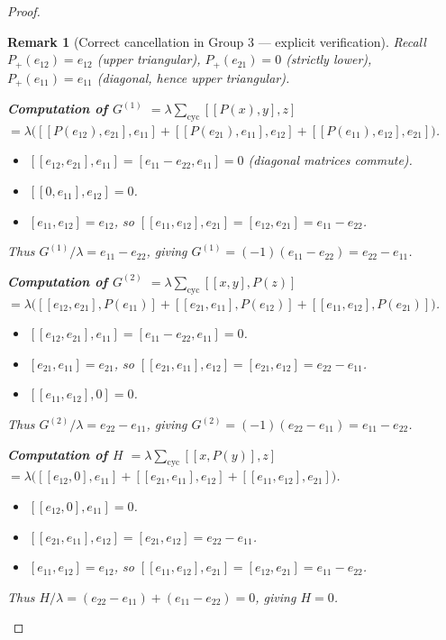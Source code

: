 \documentclass[10pt,a4paper]{amsart}
\newtheorem{remark}{Remark}
\begin{document}
\begin{proof}
\begin{remark}[Correct cancellation in Group 3 --- explicit verification]
Recall $P_+(e_{12}) = e_{12}$ (upper triangular), $P_+(e_{21}) = 0$ (strictly lower),
$P_+(e_{11}) = e_{11}$ (diagonal, hence upper triangular).

\medskip
\noindent\textbf{Computation of $G^{(1)}$} $= \lambda\sum_{\mathrm{cyc}}[[P(x),y],z]$
$= \lambda\bigl([[P(e_{12}),e_{21}],e_{11}] + [[P(e_{21}),e_{11}],e_{12}]
+ [[P(e_{11}),e_{12}],e_{21}]\bigr)$.

\begin{itemize}
  \item $[[e_{12},e_{21}],e_{11}] = [e_{11}-e_{22},e_{11}] = 0$ (diagonal matrices commute).
  \item $[[0,e_{11}],e_{12}] = 0$.
  \item $[e_{11},e_{12}] = e_{12}$, so $[[e_{11},e_{12}],e_{21}] = [e_{12},e_{21}]
        = e_{11}-e_{22}$.
\end{itemize}
Thus $G^{(1)}/\lambda = e_{11}-e_{22}$, giving $G^{(1)} = (-1)(e_{11}-e_{22}) = e_{22}-e_{11}$.

\medskip
\noindent\textbf{Computation of $G^{(2)}$} $= \lambda\sum_{\mathrm{cyc}}[[x,y],P(z)]$
$= \lambda\bigl([[e_{12},e_{21}],P(e_{11})] + [[e_{21},e_{11}],P(e_{12})]
+ [[e_{11},e_{12}],P(e_{21})]\bigr)$.

\begin{itemize}
  \item $[[e_{12},e_{21}],e_{11}] = [e_{11}-e_{22},e_{11}] = 0$.
  \item $[e_{21},e_{11}] = e_{21}$, so $[[e_{21},e_{11}],e_{12}] = [e_{21},e_{12}]
        = e_{22}-e_{11}$.
  \item $[[e_{11},e_{12}],0] = 0$.
\end{itemize}
Thus $G^{(2)}/\lambda = e_{22}-e_{11}$, giving $G^{(2)} = (-1)(e_{22}-e_{11}) = e_{11}-e_{22}$.

\medskip
\noindent\textbf{Computation of $H$} $= \lambda\sum_{\mathrm{cyc}}[[x,P(y)],z]$
$= \lambda\bigl([[e_{12},0],e_{11}] + [[e_{21},e_{11}],e_{12}]
+ [[e_{11},e_{12}],e_{21}]\bigr)$.

\begin{itemize}
  \item $[[e_{12},0],e_{11}] = 0$.
  \item $[[e_{21},e_{11}],e_{12}] = [e_{21},e_{12}] = e_{22}-e_{11}$.
  \item $[e_{11},e_{12}] = e_{12}$, so $[[e_{11},e_{12}],e_{21}] = [e_{12},e_{21}]
        = e_{11}-e_{22}$.
\end{itemize}
Thus $H/\lambda = (e_{22}-e_{11})+(e_{11}-e_{22}) = 0$, giving $H = 0$.


\end{remark}
\end{proof}
\end{document}
